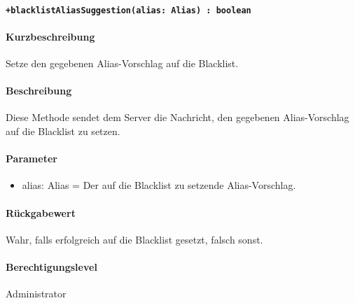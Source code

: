 \paragraph{\texttt{+blacklistAliasSuggestion(alias: Alias) : boolean}}%
\paragraph*{Kurzbeschreibung}
Setze den gegebenen Alias-Vorschlag auf die Blacklist.
\paragraph*{Beschreibung}
Diese Methode sendet dem Server die Nachricht, den gegebenen Alias-Vorschlag auf die Blacklist zu setzen.
\paragraph*{Parameter}
\begin{itemize}
    \item alias: Alias = Der auf die Blacklist zu setzende Alias-Vorschlag.
\end{itemize}
\paragraph*{Rückgabewert}
Wahr, falls erfolgreich auf die Blacklist gesetzt, falsch sonst.
\paragraph*{Berechtigungslevel}
Administrator
